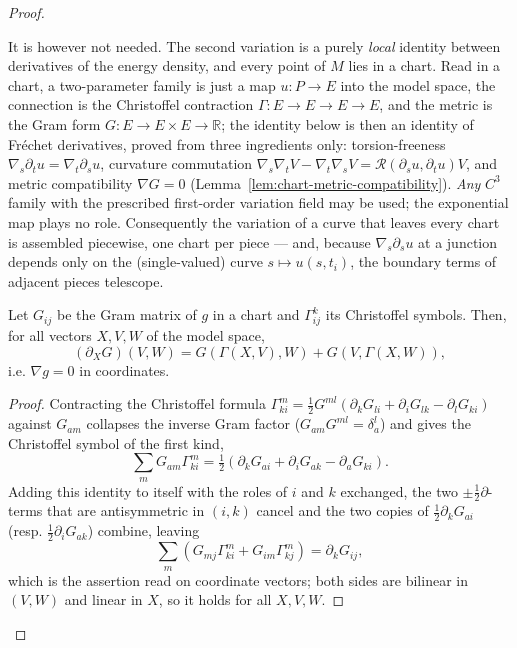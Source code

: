 \begin{proof}
\begin{remark}
It is however not needed.  The second variation is a purely \emph{local} identity
between derivatives of the energy density, and every point of $M$ lies in a chart.
Read in a chart, a two-parameter family is just a map $u\colon P\to E$ into the
model space, the connection is the Christoffel contraction
$\Gamma\colon E\to E\to E\to E$, and the metric is the Gram form
$G\colon E\to E\times E\to\mathbb R$; the identity below is then an identity of
Fréchet derivatives, proved from three ingredients only: torsion-freeness
$\nabla_s\partial_t u=\nabla_t\partial_s u$, curvature commutation
$\nabla_s\nabla_t V-\nabla_t\nabla_s V={\mathcal R}(\partial_su,\partial_tu)V$, and
metric compatibility $\nabla G=0$ (Lemma~\ref{lem:chart-metric-compatibility}).
\emph{Any} $C^3$ family with the prescribed first-order variation field may be
used; the exponential map plays no role.  Consequently the variation of a curve
that leaves every chart is assembled piecewise, one chart per piece — and, because
$\nabla_s\partial_s u$ at a junction depends only on the (single-valued) curve
$s\mapsto u(s,t_i)$, the boundary terms of adjacent pieces telescope.
\end{remark}

\begin{lemma}
\label{lem:chart-metric-compatibility}
\leanok
Let $G_{ij}$ be the Gram matrix of $g$ in a chart and $\Gamma^k_{ij}$ its
Christoffel symbols.  Then, for all vectors $X,V,W$ of the model space,
$$(\partial_X G)(V,W)=G(\Gamma(X,V),W)+G(V,\Gamma(X,W)),$$
i.e. $\nabla g=0$ in coordinates.
\end{lemma}

\begin{proof}
\leanok
Contracting the Christoffel formula
$\Gamma^m_{ki}=\tfrac12 G^{ml}(\partial_kG_{li}+\partial_iG_{lk}-\partial_lG_{ki})$
against $G_{am}$ collapses the inverse Gram factor ($G_{am}G^{ml}=\delta_a^l$) and
gives the Christoffel symbol of the first kind,
$$\textstyle\sum_m G_{am}\Gamma^m_{ki}
=\tfrac12\left(\partial_kG_{ai}+\partial_iG_{ak}-\partial_aG_{ki}\right).$$
Adding this identity to itself with the roles of $i$ and $k$ exchanged, the two
$\pm\tfrac12\partial$-terms that are antisymmetric in $(i,k)$ cancel and the two
copies of $\tfrac12\partial_kG_{ai}$ (resp. $\tfrac12\partial_iG_{ak}$) combine, leaving
$$\textstyle\sum_m\left(G_{mj}\Gamma^m_{ki}+G_{im}\Gamma^m_{kj}\right)=\partial_kG_{ij},$$
which is the assertion read on coordinate vectors; both sides are bilinear in
$(V,W)$ and linear in $X$, so it holds for all $X,V,W$.
\end{proof}


\end{proof}
